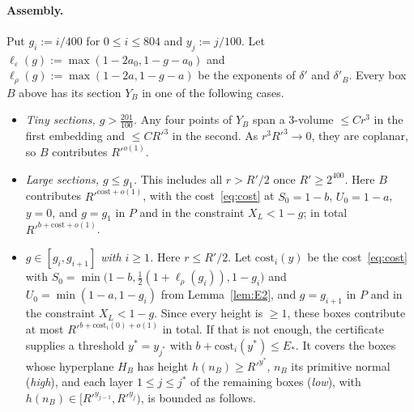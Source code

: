 \documentclass[aps,prx,twocolumn,superscriptaddress,nofootinbib,longbibliography]{revtex4-2}
\theoremstyle{plain}
\theoremstyle{definition}
\theoremstyle{remark}
\begin{document}
\paragraph{Assembly.} Put $g_i:=i/400$ for $0\le i\le804$ and $y_j:=j/100$. Let $\ell_\varepsilon(g):=\max(1-2a_0,1-g-a_0)$ and $\ell_\rho(g):=\max(1-2a,1-g-a)$ be the exponents of $\delta'$ and $\delta'_B$. Every box $B$ above has its section $Y_B$ in one of the following cases.
\begin{itemize}\setlength\itemsep{0pt}
\item \emph{Tiny sections, $g>\tfrac{201}{100}$.} Any four points of $Y_B$ span a $3$-volume $\le Cr^3$ in the first embedding and $\le CR'^3$ in the second. As $r^3R'^3\to0$, they are coplanar, so $B$ contributes $R'^{o(1)}$.
\item \emph{Large sections, $g\le g_1$.} This includes all $r>R'/2$ once $R'\ge2^{400}$. Here $B$ contributes $R'^{\mathrm{cost}+o(1)}$, with the cost~\eqref{eq:cost} at $S_0=1-b$, $U_0=1-a$, $y=0$, and $g=g_1$ in $P$ and in the constraint $X_L<1-g$; in total $R'^{b+\mathrm{cost}+o(1)}$.
\item \emph{$g\in[g_i,g_{i+1}]$ with $i\ge1$.} Here $r\le R'/2$. Let $\mathrm{cost}_i(y)$ be the cost~\eqref{eq:cost} with $S_0=\min\big(1-b,\tfrac12(1+\ell_\rho(g_i)),1-g_i\big)$ and $U_0=\min(1-a,1-g_i)$ from Lemma~\ref{lem:E2}, and $g=g_{i+1}$ in $P$ and in the constraint $X_L<1-g$. Since every height is $\ge1$, these boxes contribute at most $R'^{b+\mathrm{cost}_i(0)+o(1)}$ in total. If that is not enough, the certificate supplies a threshold $y^*=y_{j^*}$ with $b+\mathrm{cost}_i(y^*)\le E_*$. It covers the boxes whose hyperplane $H_B$ has height $h(n_B)\ge R'^{y^*}$, $n_B$ its primitive normal (\emph{high}), and each layer $1\le j\le j^*$ of the remaining boxes (\emph{low}), with $h(n_B)\in[R'^{y_{j-1}},R'^{y_j})$, is bounded as follows.
\end{itemize}
\end{document}

